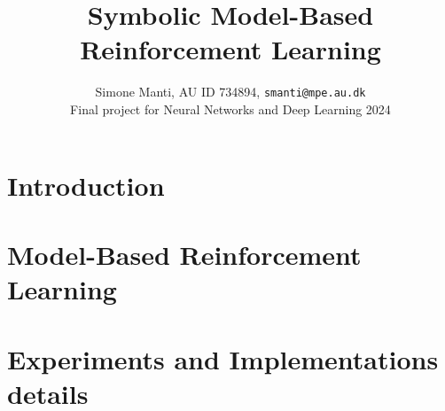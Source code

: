 \documentclass[11pt]{article}
\author{Simone Manti, AU ID 734894, \texttt{smanti@mpe.au.dk} \\
	Final project for Neural Networks and Deep Learning 2024}
\title{Symbolic Model-Based Reinforcement Learning}
\begin{document}
	\maketitle

\section{Introduction}

\section{Model-Based Reinforcement Learning}

\section{Experiments and Implementations details}


	
	
\end{document}
